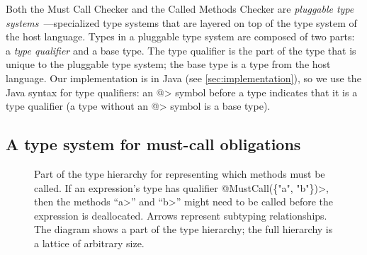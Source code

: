 Both the Must Call Checker and the Called Methods Checker are
\emph{pluggable type systems}~\cite{FosterFFA99}---specialized type
systems that are layered on top of the type system of the host
language.  Types in a pluggable type system are composed of two parts:
a \emph{type qualifier} and a base type. The type qualifier is the
part of the type that is unique to the pluggable type system; the base
type is a type from the host language. Our implementation is in Java
(see \cref{sec:implementation}), so we use the Java syntax for type
qualifiers: an \<@> symbol before a type indicates that it is a type
qualifier (a type without an \<@> symbol is a base type).

\subsection{A type system for must-call obligations}
\label{sec:must-call}

\begin{figure}

\caption{Part of the type hierarchy for representing which methods must be
  called.
  If an expression's type has qualifier \<@Must\-Call(\{"a", "b"\})>, then
  the methods ``\<a>'' and ``\<b>'' might need to be called before the
  expression is deallocated.
  Arrows represent
  subtyping relationships.
  The diagram shows a part of the type hierarchy; the full hierarchy is a
  lattice of arbitrary size. 
}
\label{fig:must-call-hierarchy}
\end{figure}

